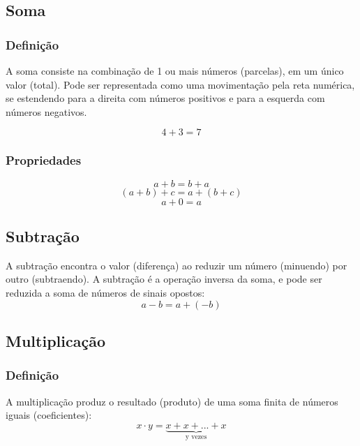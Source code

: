 \subsection{Soma}
    \subsubsection{Definição}
        A soma consiste na combinação de 1 ou mais números (parcelas), em um único valor (total). Pode ser representada como uma movimentação pela reta numérica, se estendendo para a direita com números positivos e para a esquerda com números negativos. \eg
        \begin{center}
            \[ 4 + 3 = 7 \]
        \end{center}
    \subsubsection{Propriedades}
        \[ a+b = b+a \]
        \[ (a+b)+c = a+(b+c) \]
        \[ a+0=a \]
\subsection{Subtração}
    A subtração encontra o valor (diferença) ao reduzir um número (minuendo) por outro (subtraendo). A subtração é a operação inversa da soma, e pode ser reduzida a soma de números de sinais opostos:
    \[ a - b = a + (-b) \]
\subsection{Multiplicação}
    \subsubsection{Definição}
        A multiplicação produz o resultado (produto) de uma soma finita de números iguais (coeficientes):
        \[ x \cdot y = \underbrace{x + x + ... + x}_\text{y vezes} \]
